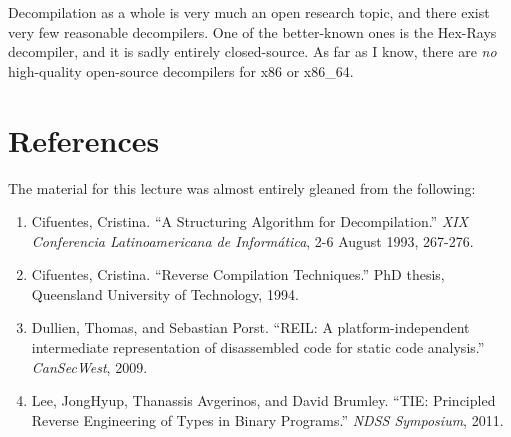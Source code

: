 \documentclass{article}
\begin{document}
Decompilation as a whole is very much an open research topic, and there exist very few reasonable
decompilers. One of the better-known ones is the Hex-Rays decompiler, and it is sadly entirely
closed-source. As far as I know, there are {\em no} high-quality open-source decompilers
for x86 or x86\_64.

\section{References}
The material for this lecture was almost entirely gleaned from the following:
\begin{enumerate}
\item Cifuentes, Cristina. ``A Structuring Algorithm for Decompilation.'' {\em XIX 
Conferencia Latinoamericana de Inform\'atica}, 2-6 August 1993, 267-276.
\item Cifuentes, Cristina. ``Reverse Compilation Techniques.'' PhD thesis, Queensland University of Technology, 1994.
\item Dullien, Thomas, and Sebastian Porst. ``REIL: A platform-independent intermediate
representation of disassembled code for static code analysis.'' {\em CanSecWest},  2009.
\item Lee, JongHyup, Thanassis Avgerinos, and David Brumley. ``TIE: Principled Reverse Engineering of Types in Binary Programs.'' {\em NDSS Symposium}, 2011.
\end{enumerate}
\end{document}
